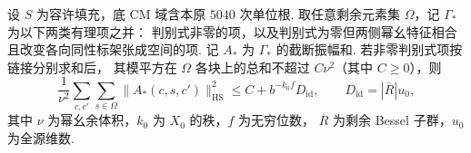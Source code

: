\begin{lemma}[余项的平方和归并]
\label{lem:b-off-link-square}
\emitthmsource
设 $S$ 为容许填充，底 CM 域含本原 $5040$ 次单位根.
取任意剩余元素集 $\Omega$，记 $\Gamma_*$ 为以下两类有理项之并：
判别式非零的项，以及判别式为零但两侧幂幺特征相合且改变各向同性标架张成空间的项.
记 $A_*$ 为 $\Gamma_*$ 的截断振幅和. 若非零判别式项按链接分别求和后，
其模平方在 $\Omega$ 各块上的总和不超过 $C\nu^2$（其中 $C\ge0$），则
\[
 \frac1{\nu^2}\sum_{c,c'}\sum_{s\in\Omega}
       \|A_*(c,s,c')\|_{\mathrm{HS}}^2
 \le C+b^{-k_0f} D_{\mathrm{id}},
 \qquad D_{\mathrm{id}}=|\overline R|u_0 ,
\]
其中 $\nu$ 为幂幺余体积，$k_0$ 为 $X_0$ 的秩，$f$ 为无穷位数，
$\overline R$ 为剩余 Bessel 子群，$u_0$ 为全源维数.
\end{lemma}

